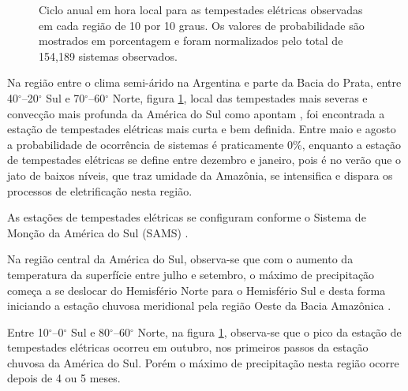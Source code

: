 \begin{figure}[!ht]
\caption{Ciclo anual em hora local para as tempestades elétricas observadas em cada região de 10 por 10 graus. Os valores de probabilidade são mostrados em porcentagem e foram normalizados pelo total de 154,189 sistemas observados.}
\label{anual}
\end{figure}

 

Na região entre o clima semi-árido na Argentina e parte da Bacia do Prata, entre 40$^{\circ}$--20$^{\circ}$ Sul e 70$^{\circ}$--60$^{\circ}$ Norte, figura \ref{anual}, local das tempestades mais severas e convecção mais profunda da América do Sul como apontam , foi encontrada a estação de tempestades elétricas mais curta e bem definida. Entre maio e agosto a probabilidade de ocorrência de sistemas é praticamente 0\%, enquanto a estação de tempestades elétricas se define entre dezembro e janeiro, pois é no verão que o jato de baixos níveis, que traz umidade da Amazônia, se intensifica e dispara os processos de eletrificação nesta região.

As estações de tempestades elétricas se configuram conforme o Sistema de Monção da América do Sul (SAMS)     \cite{Zhou1998,Marengo2012}. 

Na região central da América do Sul, observa-se que com o aumento da temperatura da superfície entre julho e setembro, o máximo de precipitação começa a se deslocar do Hemisfério Norte para o Hemisfério Sul e desta forma iniciando a estação chuvosa meridional pela região Oeste da Bacia Amazônica \cite{Marengo2012,grimm2003nino,reboita2010regimes}.

Entre 10$^{\circ}$--0$^{\circ}$ Sul e 80$^{\circ}$--60$^{\circ}$ Norte,  na figura \ref{anual}, observa-se que o pico da estação de tempestades elétricas ocorreu em outubro, nos primeiros passos da estação chuvosa da América do Sul. Porém o máximo de precipitação nesta região ocorre depois de 4 ou 5 meses. 

